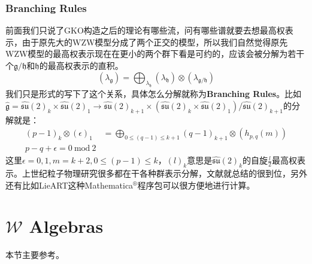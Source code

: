 \subsubsection{Branching Rules}
前面我们只说了GKO构造之后的理论有哪些流，问有哪些谱就要去想最高权表示，由于原先大的WZW模型分成了两个正交的模型，所以我们自然觉得原先WZW模型的最高权表示现在在更小的两个群下看是可约的，应该会被分解为若干个$\mathfrak{g}/\mathfrak{h}$和$\mathfrak{h}$的最高权表示的直积。
\begin{equation}
	\left(\lambda_\mathfrak{g}\right)=\bigoplus_{\lambda_\mathfrak{h}}\left(\lambda_\mathfrak{h}\right)\otimes\left(\lambda_{\mathfrak{g}/\mathfrak{h}}\right)
\end{equation}
我们只是形式的写下了这个关系，具体怎么分解就称为\textbf{Branching Rules}。比如$\hat{\mathfrak{g}}=\widehat{\mathfrak{su}}(2)_k\times\widehat{\mathfrak{su}}(2)_1\to \widehat{\mathfrak{su}}(2)_{k+1}\times (\widehat{\mathfrak{su}}(2)_k\times\widehat{\mathfrak{su}}(2)_1)/\widehat{\mathfrak{su}}(2)_{k+1}$的分解就是：
\begin{equation}
	\begin{aligned}\left(p-1\right)_k\otimes\left(\epsilon\right)_1&=\bigoplus_{0\leq(q-1)\leq k+1}\left(q-1\right)_{k+1}\otimes\left(h_{p,q}(m)\right)\\p-q+\epsilon=0\mathrm{~mod~}2\end{aligned}
\end{equation}
这里$\epsilon=0,1,m=k+2,0\leq(p-1)\leq k$，$(l)_k$意思是$\widehat{\mathfrak{su}}(2)_k$的自旋$\frac{l}{2}$最高权表示。上世纪粒子物理研究很多都在干各种群表示分解，文献\cite{Slansky:1981yr}就总结的很到位，另外还有比如LieART\cite{Feger:2012bs,Feger:2019tvk}这种Mathematica$^\circledR$程序包可以很方便地进行计算。
\section{$\mathcal{W}$ Algebras}
本节主要参考\cite{Pope:1991ig}。
